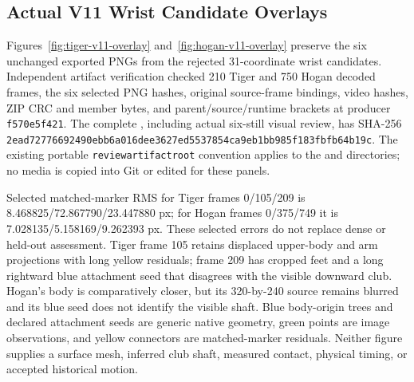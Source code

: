 \documentclass[11pt,letterpaper]{article}
\newcommand{\code}[1]{\nolinkurl{#1}}
\newcommand{\hash}[1]{{\footnotesize\nolinkurl{#1}}}
\begin{document}
\subsection{Actual V11 Wrist Candidate Overlays}
Figures~\ref{fig:tiger-v11-overlay} and~\ref{fig:hogan-v11-overlay} preserve the
six unchanged exported PNGs from the rejected 31-coordinate wrist candidates.
Independent artifact verification checked 210 Tiger and 750 Hogan decoded
frames, the six selected PNG hashes, original source-frame bindings, video
hashes, ZIP CRC and member bytes, and parent/source/runtime brackets at producer
\code{f570e5f421}. The complete
, including actual six-still
visual review, has SHA-256
\hash{2ead72776692490ebb6a016dee3627ed5537854ca9eb1bb985f183fbfb64b19c}.
The existing portable \code{reviewartifactroot} convention applies to the
 and  directories;
no media is copied into Git or edited for these panels.

Selected matched-marker RMS for Tiger frames 0/105/209 is
8.468825/72.867790/23.447880 px; for Hogan frames 0/375/749 it is
7.028135/5.158169/9.262393 px. These selected errors do not replace dense or
held-out assessment. Tiger frame 105 retains displaced upper-body and arm
projections with long yellow residuals; frame 209 has cropped feet and a long
rightward blue attachment seed that disagrees with the visible downward club.
Hogan's body is comparatively closer, but its 320-by-240 source remains blurred
and its blue seed does not identify the visible shaft. Blue body-origin trees
and declared attachment seeds are generic native geometry, green points are
image observations, and yellow connectors are matched-marker residuals.
Neither figure supplies a surface mesh, inferred club shaft, measured contact,
physical timing, or accepted historical motion.
\end{document}
